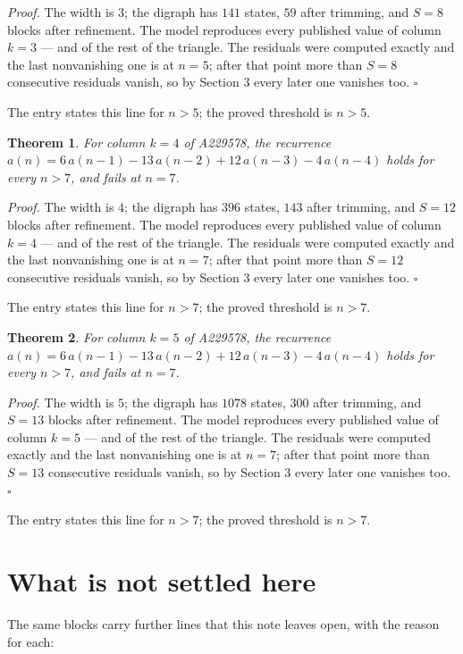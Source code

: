 \documentclass[11pt]{article}
\newtheorem{theorem}{Theorem}
\theoremstyle{definition}
\begin{document}
{\itshape Proof.} The width is $3$; the digraph has $141$ states, $59$ after trimming, and $S = 8$ blocks after refinement. The model reproduces every published value of column $k = 3$ --- and of the rest of the triangle. The residuals were computed exactly and the last nonvanishing one is at $n = 5$; after that point more than $S = 8$ consecutive residuals vanish, so by Section 3 every later one vanishes too. $\square$

The entry states this line for $n > 5$; the proved threshold is $n > 5$.

\begin{theorem} For column $k = 4$ of A229578, the recurrence $a(n) = 6\,a(n-1) - 13\,a(n-2) + 12\,a(n-3) - 4\,a(n-4)$ holds for every $n > 7$, and fails at $n = 7$.\end{theorem}

{\itshape Proof.} The width is $4$; the digraph has $396$ states, $143$ after trimming, and $S = 12$ blocks after refinement. The model reproduces every published value of column $k = 4$ --- and of the rest of the triangle. The residuals were computed exactly and the last nonvanishing one is at $n = 7$; after that point more than $S = 12$ consecutive residuals vanish, so by Section 3 every later one vanishes too. $\square$

The entry states this line for $n > 7$; the proved threshold is $n > 7$.

\begin{theorem} For column $k = 5$ of A229578, the recurrence $a(n) = 6\,a(n-1) - 13\,a(n-2) + 12\,a(n-3) - 4\,a(n-4)$ holds for every $n > 7$, and fails at $n = 7$.\end{theorem}

{\itshape Proof.} The width is $5$; the digraph has $1078$ states, $300$ after trimming, and $S = 13$ blocks after refinement. The model reproduces every published value of column $k = 5$ --- and of the rest of the triangle. The residuals were computed exactly and the last nonvanishing one is at $n = 7$; after that point more than $S = 13$ consecutive residuals vanish, so by Section 3 every later one vanishes too. $\square$

The entry states this line for $n > 7$; the proved threshold is $n > 7$.

\section{What is not settled here}

The same blocks carry further lines that this note leaves open, with the reason for each:
\end{document}
